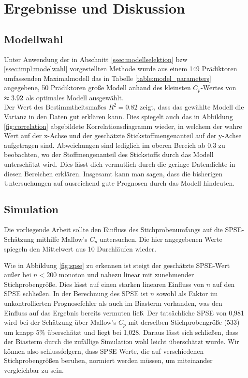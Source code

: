 \section{Ergebnisse und Diskussion}
\label{sec:discuss}

\subsection{Modellwahl}
\label{ssec:discuss:modelselect}
Unter Anwendung der in Abschnitt \ref{ssec:modellselektion} bzw \ref{ssec:impl:modelwahl} vorgestellten Methode wurde aus einem 149 Prädiktoren umfassenden Maximalmodell das in Tabelle \ref{table:model_parameters} angegebene, 50 Prädiktoren große Modell anhand des kleinsten $C_p$-Wertes von $\mathrm{\approx3.92}$ als optimales Modell ausgewählt.\\

Der Wert des Bestimmtheitsmaßes $R^2 = 0.82$ zeigt, dass das gewählte Modell die Varianz in den Daten gut erklären kann. Dies spiegelt auch das in Abbildung \ref{fig:correlation} abgebildete Korrelationsdiagramm wieder, in welchem der wahre Wert auf der x-Achse und der geschätzte Stickstoffmengenanteil auf der y-Achse aufgetragen sind.
Abweichungen sind lediglich im oberen Bereich ab $0.3$ zu beobachten, wo der Stoffmengenanteil des Stickstoffs durch das Modell unterschätzt wird.
Dies lässt dich vermutlich durch die geringe Datendichte in diesen Bereichen erklären.
Insgesamt kann man sagen, dass die bisherigen Untersuchungen auf ausreichend gute Prognosen durch das Modell hindeuten.



\subsection{Simulation}
\label{ssec:discuss:simulation}
Die vorliegende Arbeit sollte den Einfluss des Stichprobenumfangs auf die SPSE-Schätzung mithilfe Mallow's $C_p$ untersuchen. Die hier angegebenen Werte spiegeln den Mittelwert aus 10 Durchläufen wieder.



Wie in Abbildung \ref{fig:spse} zu erkennen ist steigt der geschätzte SPSE-Wert außer bei $n < 200$ monoton und nahezu linear mit zunehmender Stichprobengröße. Dies lässt auf einen starken linearen Einfluss von $n$ auf den SPSE schließen. In der Berechnung des SPSE ist $n$ sowohl als Faktor im unkontrollierten Prognosefehler als auch im Biasterm vorhanden, was den Einfluss auf das Ergebnis bereits vermuten ließ.
Der tatsächliche SPSE von 0,981 wird bei der Schätzung über Mallow's $C_p$ mit derselben Stichprobengröße (533) um knapp 5\% überschätzt und liegt bei 1,028. 
Daraus lässt sich schließen, dass der Biasterm durch die zufällige Simulation wohl leicht überschätzt wurde.
Wir können also schlussfolgern, dass SPSE Werte, die auf verschiedenen Stichprobengrößen beruhen, normiert werden müssen, um miteinander vergleichbar zu sein.


